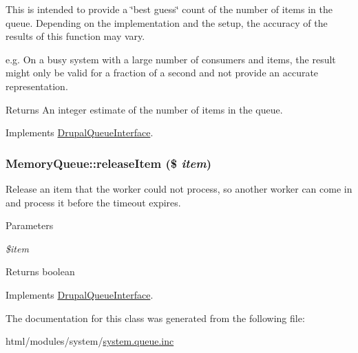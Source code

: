This is intended to provide a \char`\"{}best guess\char`\"{} count of the number of items in the queue. Depending on the implementation and the setup, the accuracy of the results of this function may vary.

e.g. On a busy system with a large number of consumers and items, the result might only be valid for a fraction of a second and not provide an accurate representation.

\begin{DoxyReturn}{Returns}
An integer estimate of the number of items in the queue. 
\end{DoxyReturn}


Implements \hyperlink{interfaceDrupalQueueInterface_aee5a22d355c9e6246690d0ed79fe306b}{DrupalQueueInterface}.\hypertarget{classMemoryQueue_ad835863a58ca48f31f8cb1e3807b88cf}{
\subsubsection[{releaseItem}]{\setlength{\rightskip}{0pt plus 5cm}MemoryQueue::releaseItem (\$ {\em item})}}
\label{classMemoryQueue_ad835863a58ca48f31f8cb1e3807b88cf}
Release an item that the worker could not process, so another worker can come in and process it before the timeout expires.


\begin{DoxyParams}{Parameters}
\item[{\em \$item}]\end{DoxyParams}
\begin{DoxyReturn}{Returns}
boolean 
\end{DoxyReturn}


Implements \hyperlink{interfaceDrupalQueueInterface_a7f4ce9d592779327cd24dbf90566da67}{DrupalQueueInterface}.

The documentation for this class was generated from the following file:\begin{DoxyCompactItemize}
\item 
html/modules/system/\hyperlink{system_8queue_8inc}{system.queue.inc}\end{DoxyCompactItemize}
